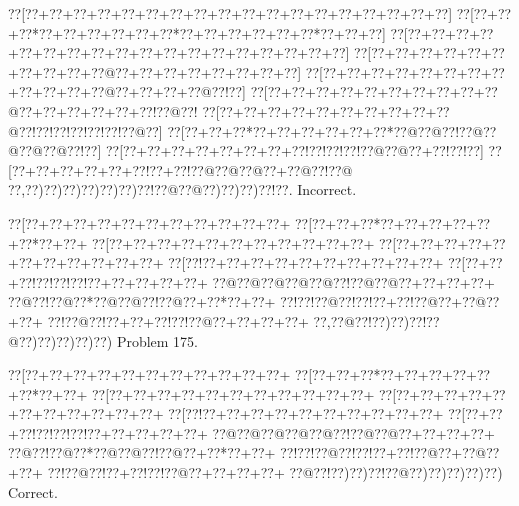 \documentclass[a5paper]{article}
\begin{document}
\begin{center}
{\goo
\0??[\0??+\0??+\0??+\0??+\0??+\0??+\0??+\0??+\0??+\0??+\0??+\0??+\0??+\0??+\0??+\0??+\0??+\0??]
\0??[\0??+\0??+\0??*\0??+\0??+\0??+\0??+\0??+\0??*\0??+\0??+\0??+\0??+\0??+\0??*\0??+\0??+\0??]
\0??[\0??+\0??+\0??+\0??+\0??+\0??+\0??+\0??+\0??+\0??+\0??+\0??+\0??+\0??+\0??+\0??+\0??+\0??]
\0??[\0??+\0??+\0??+\0??+\0??+\0??+\0??+\0??+\0??+\0??@\0??+\0??+\0??+\0??+\0??+\0??+\0??+\0??]
\0??[\0??+\0??+\0??+\0??+\0??+\0??+\0??+\0??+\0??+\0??+\0??+\0??@\0??+\0??+\0??+\0??@\0??!\0??]
\0??[\0??+\0??+\0??+\0??+\0??+\0??+\0??+\0??+\0??+\0??@\0??+\0??+\0??+\0??+\0??+\0??!\0??@\0??!
\0??[\0??+\0??+\0??+\0??+\0??+\0??+\0??+\0??+\0??+\0??@\0??!\0??!\0??!\0??!\0??!\0??!\0??@\0??]
\0??[\0??+\0??+\0??*\0??+\0??+\0??+\0??+\0??+\0??*\0??@\0??@\0??!\0??@\0??@\0??@\0??@\0??!\0??]
\0??[\0??+\0??+\0??+\0??+\0??+\0??+\0??+\0??!\0??!\0??!\0??!\0??@\0??@\0??+\0??!\0??!\0??]
\0??[\0??+\0??+\0??+\0??+\0??+\0??!\0??+\0??!\0??@\0??@\0??@\0??+\0??@\0??!\0??@
\0??,\0??)\0??)\0??)\0??)\0??)\0??)\0??!\0??@\0??@\0??)\0??)\0??)\0??!\0??.
}
Incorrect. 

\end{center}
\newpage
\begin{center}
{\goo
\0??[\0??+\0??+\0??+\0??+\0??+\0??+\0??+\0??+\0??+\0??+\0??+
\0??[\0??+\0??+\0??*\0??+\0??+\0??+\0??+\0??+\0??*\0??+\0??+
\0??[\0??+\0??+\0??+\0??+\0??+\0??+\0??+\0??+\0??+\0??+\0??+
\0??[\0??+\0??+\0??+\0??+\0??+\0??+\0??+\0??+\0??+\0??+\0??+
\0??[\0??!\0??+\0??+\0??+\0??+\0??+\0??+\0??+\0??+\0??+\0??+
\0??[\0??+\0??+\0??!\0??!\0??!\0??!\0??+\0??+\0??+\0??+\0??+
\0??@\0??@\0??@\0??@\0??@\0??!\0??@\0??@\0??+\0??+\0??+\0??+
\0??@\0??!\0??@\0??*\0??@\0??@\0??!\0??@\0??+\0??*\0??+\0??+
\0??!\0??!\0??@\0??!\0??!\0??+\0??!\0??@\0??+\0??@\0??+\0??+
\0??!\0??@\0??!\0??+\0??+\0??!\0??!\0??@\0??+\0??+\0??+\0??+
\0??,\0??@\0??!\0??)\0??)\0??!\0??@\0??)\0??)\0??)\0??)\0??)
}
Problem 175.

\end{center}
\begin{center}
{\goo
\0??[\0??+\0??+\0??+\0??+\0??+\0??+\0??+\0??+\0??+\0??+\0??+
\0??[\0??+\0??+\0??*\0??+\0??+\0??+\0??+\0??+\0??*\0??+\0??+
\0??[\0??+\0??+\0??+\0??+\0??+\0??+\0??+\0??+\0??+\0??+\0??+
\0??[\0??+\0??+\0??+\0??+\0??+\0??+\0??+\0??+\0??+\0??+\0??+
\0??[\0??!\0??+\0??+\0??+\0??+\0??+\0??+\0??+\0??+\0??+\0??+
\0??[\0??+\0??+\0??!\0??!\0??!\0??!\0??+\0??+\0??+\0??+\0??+
\0??@\0??@\0??@\0??@\0??@\0??!\0??@\0??@\0??+\0??+\0??+\0??+
\0??@\0??!\0??@\0??*\0??@\0??@\0??!\0??@\0??+\0??*\0??+\0??+
\0??!\0??!\0??@\0??!\0??!\0??+\0??!\0??@\0??+\0??@\0??+\0??+
\0??!\0??@\0??!\0??+\0??!\0??!\0??@\0??+\0??+\0??+\0??+
\0??@\0??!\0??)\0??)\0??!\0??@\0??)\0??)\0??)\0??)\0??)
}
Correct. 

\end{center}
\end{document}
